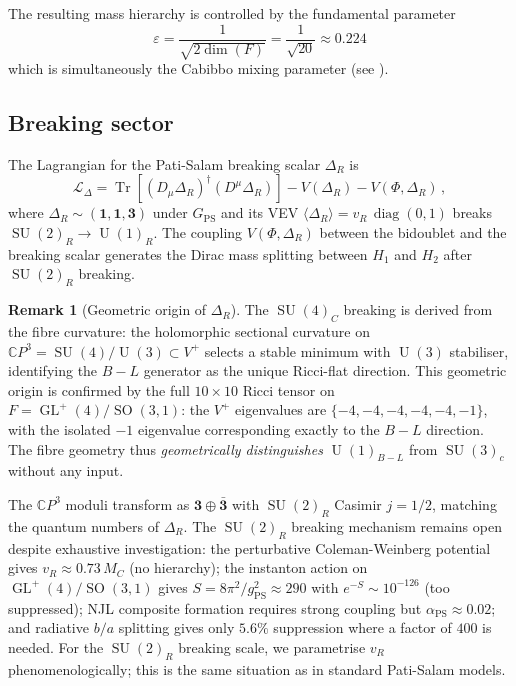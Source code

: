 \documentclass[12pt,a4paper]{article}
\theoremstyle{definition}
\newtheorem{remark}[theorem]{Remark}
\newcommand{\Tr}{\operatorname{Tr}}
\newcommand{\GL}{\operatorname{GL}}
\newcommand{\SO}{\operatorname{SO}}
\newcommand{\SU}{\operatorname{SU}}
\newcommand{\U}{\operatorname{U}}
\newcommand{\diag}{\operatorname{diag}}
\newcommand{\CP}{\mathbb{C}P}
\begin{document}
The resulting mass hierarchy is controlled by the fundamental parameter
\begin{equation}
\label{eq:epsilon}
\boxed{\varepsilon = \frac{1}{\sqrt{2\dim(F)}} = \frac{1}{\sqrt{20}} \approx 0.224}
\end{equation}
which is simultaneously the Cabibbo mixing parameter (see ).

\subsection{Breaking sector}

The Lagrangian for the Pati-Salam breaking scalar $\Delta_R$ is
\begin{equation}
\label{eq:L_delta}
\mathcal{L}_\Delta = \Tr\!\left[(D_\mu \Delta_R)^\dagger (D^\mu \Delta_R)\right] - V(\Delta_R) - V(\Phi, \Delta_R)\,,
\end{equation}
where $\Delta_R \sim (\mathbf{1},\mathbf{1},\mathbf{3})$ under $G_{\mathrm{PS}}$ and its VEV $\langle \Delta_R \rangle = v_R\, \diag(0, 1)$ breaks $\SU(2)_R \to \U(1)_R$.
The coupling $V(\Phi, \Delta_R)$ between the bidoublet and the breaking scalar generates the Dirac mass splitting between $H_1$ and $H_2$ after $\SU(2)_R$ breaking.

\begin{remark}[Geometric origin of $\Delta_R$]
The $\SU(4)_C$ breaking is derived from the fibre curvature: the holomorphic sectional curvature on $\CP^3 = \SU(4)/\U(3) \subset V^+$ selects a stable minimum with $\U(3)$ stabiliser, identifying the $B{-}L$ generator as the unique Ricci-flat direction.
This geometric origin is confirmed by the full $10 \times 10$ Ricci tensor on $F = \GL^+(4)/\SO(3,1)$: the $V^+$ eigenvalues are $\{-4, -4, -4, -4, -4, -1\}$, with the isolated $-1$ eigenvalue corresponding exactly to the $B{-}L$ direction. The fibre geometry thus \emph{geometrically distinguishes} $\U(1)_{B-L}$ from $\SU(3)_c$ without any input.

The $\CP^3$ moduli transform as $\mathbf{3} \oplus \bar{\mathbf{3}}$ with $\SU(2)_R$ Casimir $j = 1/2$, matching the quantum numbers of $\Delta_R$.
The $\SU(2)_R$ breaking mechanism remains open despite exhaustive investigation: the perturbative Coleman-Weinberg potential gives $v_R \approx 0.73\, M_C$ (no hierarchy); the instanton action on $\GL^+(4)/\SO(3,1)$ gives $S = 8\pi^2/g_{\mathrm{PS}}^2 \approx 290$ with $e^{-S} \sim 10^{-126}$ (too suppressed); NJL composite formation requires strong coupling but $\alpha_{\mathrm{PS}} \approx 0.02$; and radiative $b/a$ splitting gives only $5.6\%$ suppression where a factor of $400$ is needed.
For the $\SU(2)_R$ breaking scale, we parametrise $v_R$ phenomenologically; this is the same situation as in standard Pati-Salam models.
\end{remark}
\end{document}
